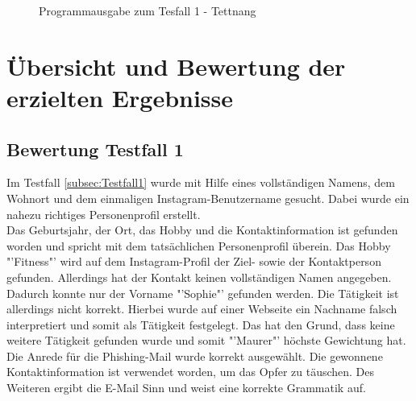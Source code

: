 			\begin{figure}[h!]
				\caption{Programmausgabe zum Tesfall 1 - Tettnang}
			\end{figure}
			\FloatBarrier
			
\section{Übersicht und Bewertung der erzielten Ergebnisse}
	\subsection{Bewertung Testfall 1}
	Im Testfall \ref{subsec:Testfall1} wurde mit Hilfe eines vollständigen Namens, dem Wohnort und dem einmaligen Instagram-Benutzername gesucht. Dabei wurde ein nahezu richtiges Personenprofil erstellt.\\
	Das Geburtsjahr, der Ort, das Hobby und die Kontaktinformation ist gefunden worden und spricht mit dem tatsächlichen Personenprofil überein. Das Hobby "'Fitness"' wird auf dem Instagram-Profil der Ziel- sowie der Kontaktperson gefunden. Allerdings hat der Kontakt keinen vollständigen Namen angegeben. Dadurch konnte nur der Vorname "'Sophie"' gefunden werden. Die Tätigkeit ist allerdings nicht korrekt. Hierbei wurde auf einer Webseite ein Nachname falsch interpretiert und somit als Tätigkeit festgelegt. Das hat den Grund, dass keine weitere Tätigkeit gefunden wurde und somit "'Maurer"' höchste Gewichtung hat. \\ %
	Die Anrede für die Phishing-Mail wurde korrekt ausgewählt. Die gewonnene Kontaktinformation ist verwendet worden, um das Opfer zu täuschen. Des Weiteren ergibt die E-Mail Sinn und weist eine korrekte Grammatik auf. 
